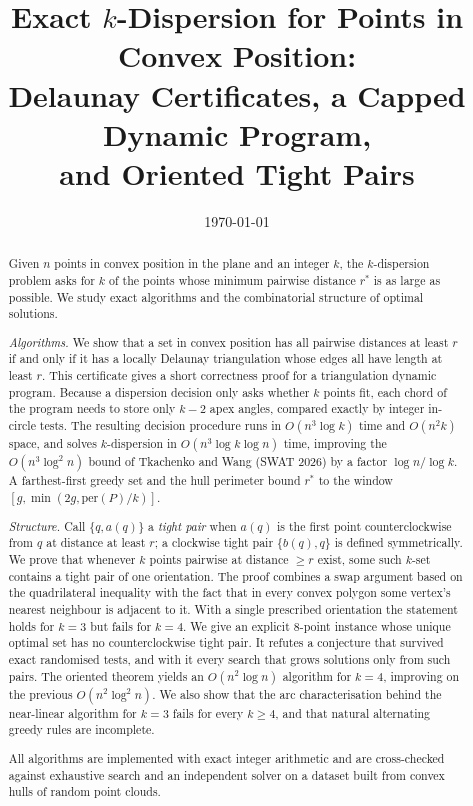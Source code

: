 \documentclass[11pt,a4paper]{article}
\title{Exact $k$-Dispersion for Points in Convex Position:\\
  Delaunay Certificates, a Capped Dynamic Program,\\
  and Oriented Tight Pairs}
\author{\ProjectAuthors}
\date{\today}
\theoremstyle{definition}
\newcommand{\opt}{r^{*}}
\begin{document}
\maketitle

\begin{abstract}
Given $n$ points in convex position in the plane and an integer $k$, the
$k$-dispersion problem asks for $k$ of the points whose minimum pairwise
distance $\opt$ is as large as possible. We study exact algorithms and the
combinatorial structure of optimal solutions.

\emph{Algorithms.} We show that a set in convex position has all pairwise
distances at least $r$ if and only if it has a locally Delaunay triangulation
whose edges all have length at least $r$. This certificate gives a short
correctness proof for a triangulation dynamic program. Because a dispersion
decision only asks whether $k$ points fit, each chord of the program needs to
store only $k-2$ apex angles, compared exactly by integer in-circle tests.
The resulting decision procedure runs in $O(n^3\log k)$ time and $O(n^2k)$
space, and solves $k$-dispersion in $O(n^3\log k\log n)$ time, improving the
$O(n^3\log^2n)$ bound of Tkachenko and Wang (SWAT 2026) by a factor
$\log n/\log k$. A farthest-first greedy set and the hull perimeter bound
$\opt$ to the window $[g,\min(2g,\mathrm{per}(P)/k)]$.

\emph{Structure.} Call $\{q,a(q)\}$ a \emph{tight pair} when $a(q)$ is the
first point counterclockwise from $q$ at distance at least $r$; a clockwise
tight pair $\{b(q),q\}$ is defined symmetrically. We prove that whenever
$k$ points pairwise at distance $\ge r$ exist, some such $k$-set contains a
tight pair of one orientation. The proof combines a swap argument based on the
quadrilateral inequality with the fact that in every convex polygon some
vertex's nearest neighbour is adjacent to it. With a single prescribed
orientation the statement holds for $k=3$ but fails for $k=4$. We give an
explicit 8-point instance whose unique optimal set has no counterclockwise
tight pair. It refutes a conjecture that survived \ConeAllTests{} exact
randomised tests, and with it every search that grows solutions only from
such pairs. The oriented theorem yields an $O(n^2\log n)$ algorithm for $k=4$,
improving on the previous $O(n^2\log^2n)$. We also show that the arc
characterisation behind the near-linear algorithm for $k=3$ fails for every
$k\ge4$, and that natural alternating greedy rules are incomplete.

All algorithms are implemented with exact integer arithmetic and are
cross-checked against exhaustive search and an independent solver on a dataset
built from convex hulls of random point clouds.
\end{abstract}
\end{document}
